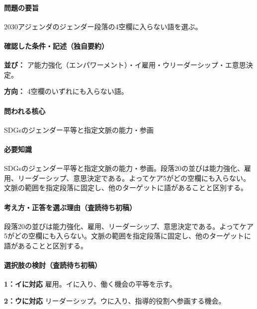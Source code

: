 \paragraph{問題の要旨} 2030アジェンダのジェンダー段落の4空欄に入らない語を選ぶ。

\paragraph{確認した条件・記述（独自要約）}\mbox{}\par

\noindent\textbf{並び：} ア能力強化（エンパワーメント）・イ雇用・ウリーダーシップ・エ意思決定。\par

\noindent\textbf{方向：} 4空欄のいずれにも入らない語。\par

\paragraph{問われる核心} SDGsのジェンダー平等と指定文脈の能力・参画

\paragraph{必要知識} SDGsのジェンダー平等と指定文脈の能力・参画。段落20の並びは能力強化、雇用、リーダーシップ、意思決定である。よってケア5がどの空欄にも入らない。文脈の範囲を指定段落に固定し、他のターゲットに語があることと区別する。

\paragraph{考え方・正答を選ぶ理由（査読待ち初稿）} 段落20の並びは能力強化、雇用、リーダーシップ、意思決定である。よってケア5がどの空欄にも入らない。文脈の範囲を指定段落に固定し、他のターゲットに語があることと区別する。

\paragraph{選択肢の検討（査読待ち初稿）}\mbox{}\par

\noindent\textbf{1：イに対応} 雇用。イに入り、働く機会の平等を示す。\par

\noindent\textbf{2：ウに対応} リーダーシップ。ウに入り、指導的役割へ参画する機会。\par

